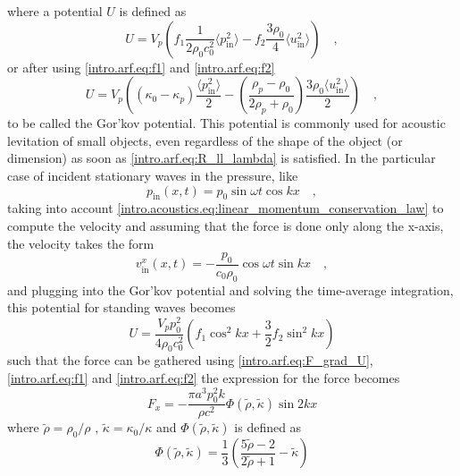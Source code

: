 where a potential $U$ is defined as
\begin{equation}\label{intro.arf.eq:Gorkov_potential_U_f1f2}
    U = V_p\left(f_1\frac{1}{2\rho_0 c_0^2}\langle p_{\text{in}}^2 \rangle - f_2\frac{3\rho_0}{4} \langle u_{\text{in}}^2 \rangle\right)\quad,
\end{equation}
or after using \eqref{intro.arf.eq:f1} and \eqref{intro.arf.eq:f2}
\begin{equation}\label{intro.arf.eq:Gorkov_potential_U_kappa_rho}
    U = V_p\left(\left(\kappa_0-\kappa_p\right)\frac{\langle p_{\text{in}}^2 \rangle}{2} - \left(\frac{\rho_p - \rho_0}{2\rho_p + \rho_0}\right)\frac{3\rho_0\langle u_{\text{in}}^2 \rangle}{2}\right)\quad,
\end{equation}
to be called the Gor'kov potential. This potential is commonly used for acoustic levitation of small objects, even regardless of the shape of the object (or dimension) as soon as \eqref{intro.arf.eq:R_ll_lambda} is satisfied. In the particular case of incident stationary waves in the pressure, like
\begin{equation}
    p_{\text{in}}(x,t) = p_0\sin\omega t\cos kx\quad,
\end{equation}
taking into account \eqref{intro.acoustics.eq:linear_momentum_conservation_law} to compute the velocity and assuming that the force is done only along the x-axis, the velocity takes the form
\begin{equation}
    v_{\text{in}}^x(x,t) = -\frac{p_0}{c_0\rho_0}\cos\omega t\sin kx\quad,
\end{equation}
and plugging into the Gor'kov potential and solving the time-average integration, this potential for standing waves becomes
\begin{equation}
    U = \frac{V_pp_0^2}{4\rho_0 c_0^2}\left(f_1\cos^2kx+\frac{3}{2}f_2\sin^2kx\right)
\end{equation}
such that the force can be gathered using \eqref{intro.arf.eq:F_grad_U}, \eqref{intro.arf.eq:f1} and \eqref{intro.arf.eq:f2} the expression for the force becomes
\begin{equation}
    F_x = -\frac{\pi a^3p_0^2k}{\rho c^2}\Phi(\tilde\rho,\tilde\kappa)\sin 2kx
\end{equation}
where $\tilde\rho = \rho_0/\rho$ , $\tilde\kappa = \kappa_0/\kappa$ and $\Phi(\tilde\rho,\tilde\kappa)$ is defined as
\begin{equation}
    \Phi(\tilde\rho,\tilde\kappa) = \frac{1}{3}\left(\frac{5\tilde\rho -2}{2\tilde\rho+1}-\tilde\kappa\right)
\end{equation}

\section{}

